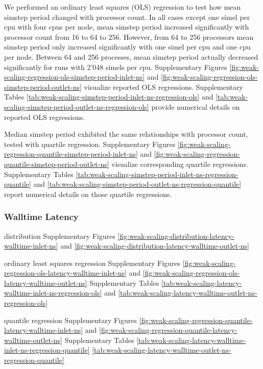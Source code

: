We performed an ordinary least squares (OLS) regression to test how mean simstep period changed with processor count.
In all cases except one simel per cpu with four cpus per node, mean simstep period increased significantly with processor count from 16 to 64 to 256.
However, from 64 to 256 processors mean simstep period only increased significantly with one simel per cpu and one cpu per node.
Between 64 and 256 processes, mean simstep period actually decreased significantly for runs with 2'048 simels per cpu.
Supplementary Figures \ref{fig:weak-scaling-regression-ols-simstep-period-inlet-ns} and \ref{fig:weak-scaling-regression-ols-simstep-period-outlet-ns} visualize reported OLS regressions.
Supplementary Tables \ref{tab:weak-scaling-simstep-period-inlet-ns-regression-ols} and \ref{tab:weak-scaling-simstep-period-outlet-ns-regression-ols} provide numerical details on reported OLS regressions.

Median simstep period exhibited the same relationships with processor count, tested with quartile regression.
Supplementary Figures \ref{fig:weak-scaling-regression-quantile-simstep-period-inlet-ns} and \ref{fig:weak-scaling-regression-quantile-simstep-period-outlet-ns} visualize corresponding quartile regressions.
Supplementary Tables \ref{tab:weak-scaling-simstep-period-inlet-ns-regression-quantile} and \ref{tab:weak-scaling-simstep-period-outlet-ns-regression-quantile} report numerical details on those quartile regressions.

\subsubsection{Walltime Latency}

distribution Supplementary Figures \ref{fig:weak-scaling-distribution-latency-walltime-inlet-ns} and \ref{fig:weak-scaling-distribution-latency-walltime-outlet-ns}

ordinary least squares regression Supplementary Figures \ref{fig:weak-scaling-regression-ols-latency-walltime-inlet-ns} and \ref{fig:weak-scaling-regression-ols-latency-walltime-outlet-ns} Supplementary Tables \ref{tab:weak-scaling-latency-walltime-inlet-ns-regression-ols} and \ref{tab:weak-scaling-latency-walltime-outlet-ns-regression-ols}

quantile regression Supplementary Figures \ref{fig:weak-scaling-regression-quantile-latency-walltime-inlet-ns} and \ref{fig:weak-scaling-regression-quantile-latency-walltime-outlet-ns}
Supplementary Tables \ref{tab:weak-scaling-latency-walltime-inlet-ns-regression-quantile} \ref{tab:weak-scaling-latency-walltime-outlet-ns-regression-quantile}


